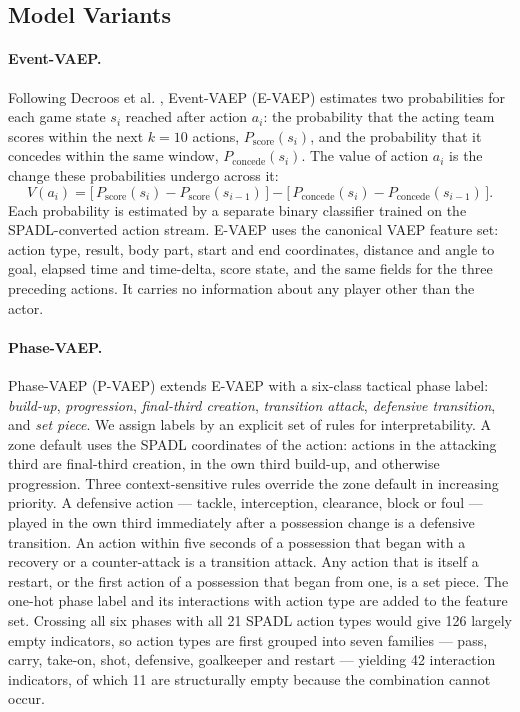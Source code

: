 \documentclass[runningheads]{llncs}
\begin{document}
\subsection{Model Variants}

\paragraph{\textbf{Event-VAEP.}}
Following Decroos et al. \cite{decroos2019actions}, Event-VAEP (E-VAEP) estimates two probabilities for each game state $s_i$ reached after action $a_i$: the probability that the acting team scores within the next $k = 10$ actions, $P_{\text{score}}(s_i)$, and the probability that it concedes within the same window, $P_{\text{concede}}(s_i)$. The value of action $a_i$ is the change these probabilities undergo across it:
\[
V(a_i) = \big[\, P_{\text{score}}(s_i) - P_{\text{score}}(s_{i-1}) \,\big] - \big[\, P_{\text{concede}}(s_i) - P_{\text{concede}}(s_{i-1}) \,\big].
\]
Each probability is estimated by a separate binary classifier trained on the SPADL-converted action stream. E-VAEP uses the canonical VAEP feature set: action type, result, body part, start and end coordinates, distance and angle to goal, elapsed time and time-delta, score state, and the same fields for the three preceding actions. It carries no information about any player other than the actor.

\paragraph{\textbf{Phase-VAEP.}}

Phase-VAEP (P-VAEP) extends E-VAEP with a six-class tactical phase label: \emph{build-up}, \emph{progression}, \emph{final-third creation}, \emph{transition attack}, \emph{defensive transition}, and \emph{set piece}. We assign labels by an explicit set of rules for interpretability. A zone default uses the SPADL coordinates of the action: actions in the attacking third are final-third creation, in the own third build-up, and otherwise progression. Three context-sensitive rules override the zone default in increasing priority. A defensive action --- tackle, interception, clearance, block or foul --- played in the own third immediately after a possession change is a defensive transition. An action within five seconds of a possession that began with a recovery or a counter-attack is a transition attack. Any action that is itself a restart, or the first action of a possession that began from one, is a set piece. The one-hot phase label and its interactions with action type are added to the feature set. Crossing all six phases with all 21 SPADL action types would give 126 largely empty indicators, so action types are first grouped into seven families --- pass, carry, take-on, shot, defensive, goalkeeper and restart --- yielding 42 interaction indicators, of which 11 are structurally empty because the combination cannot occur.
\end{document}
